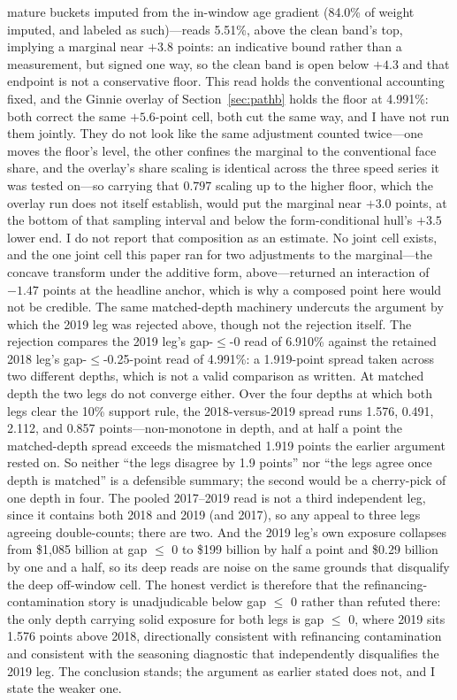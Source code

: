 \documentclass[12pt]{article}
\begin{document}
mature buckets imputed from the in-window age gradient (84.0\% of weight imputed, and labeled as such)---reads 5.51\%, above the clean band's top, implying a marginal near $+3.8$ points: an indicative bound rather than a measurement, but signed one way, so the clean band is open below $+4.3$ and that endpoint is not a conservative floor. This read holds the conventional accounting fixed, and the Ginnie overlay of Section~\ref{sec:pathb} holds the floor at 4.991\%: both correct the same $+5.6$-point cell, both cut the same way, and I have not run them jointly. They do not look like the same adjustment counted twice---one moves the floor's level, the other confines the marginal to the conventional face share, and the overlay's share scaling is identical across the three speed series it was tested on---so carrying that $0.797$ scaling up to the higher floor, which the overlay run does not itself establish, would put the marginal near $+3.0$ points, at the bottom of that sampling interval and below the form-conditional hull's $+3.5$ lower end. I do not report that composition as an estimate. No joint cell exists, and the one joint cell this paper ran for two adjustments to the marginal---the concave transform under the additive form, above---returned an interaction of $-1.47$ points at the headline anchor, which is why a composed point here would not be credible.
The same matched-depth machinery undercuts the argument by which the 2019 leg was rejected above, though not the rejection itself. The rejection compares the 2019 leg's gap-$\leq$-0 read of 6.910\% against the retained 2018 leg's gap-$\leq$-0.25-point read of 4.991\%: a 1.919-point spread taken across two different depths, which is not a valid comparison as written. At matched depth the two legs do not converge either. Over the four depths at which both legs clear the 10\% support rule, the 2018-versus-2019 spread runs 1.576, 0.491, 2.112, and 0.857 points---non-monotone in depth, and at half a point the matched-depth spread exceeds the mismatched 1.919 points the earlier argument rested on. So neither ``the legs disagree by 1.9 points'' nor ``the legs agree once depth is matched'' is a defensible summary; the second would be a cherry-pick of one depth in four. The pooled 2017--2019 read is not a third independent leg, since it contains both 2018 and 2019 (and 2017), so any appeal to three legs agreeing double-counts; there are two. And the 2019 leg's own exposure collapses from \$1{,}085 billion at gap $\leq$ 0 to \$199 billion by half a point and \$0.29 billion by one and a half, so its deep reads are noise on the same grounds that disqualify the deep off-window cell. The honest verdict is therefore that the refinancing-contamination story is unadjudicable below gap $\leq$ 0 rather than refuted there: the only depth carrying solid exposure for both legs is gap $\leq$ 0, where 2019 sits 1.576 points above 2018, directionally consistent with refinancing contamination and consistent with the seasoning diagnostic that independently disqualifies the 2019 leg. The conclusion stands; the argument as earlier stated does not, and I state the weaker one.
\end{document}
